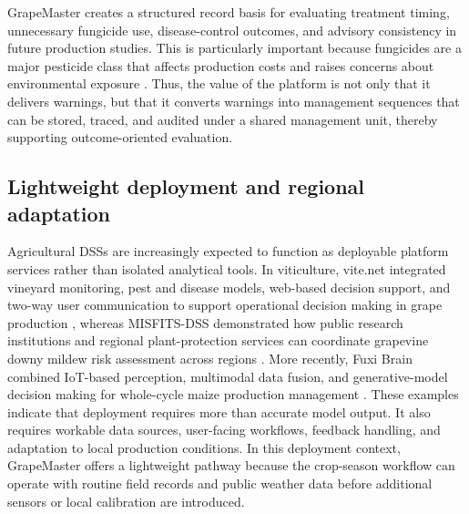 \documentclass[12pt]{article}
\begin{document}
GrapeMaster creates a structured record basis for evaluating treatment timing, unnecessary fungicide use, disease-control outcomes, and advisory consistency in future production studies. This is particularly important because fungicides are a major pesticide class that affects production costs and raises concerns about environmental exposure \citep{zubrodFungicidesOverlookedPesticide2019}. Thus, the value of the platform is not only that it delivers warnings, but that it converts warnings into management sequences that can be stored, traced, and audited under a shared management unit, thereby supporting outcome-oriented evaluation.

\subsection{Lightweight deployment and regional adaptation}\label{lightweight-deployment-and-regional-adaptation}

Agricultural DSSs are increasingly expected to function as deployable platform services rather than isolated analytical tools. In viticulture, vite.net integrated vineyard monitoring, pest and disease models, web-based decision support, and two-way user communication to support operational decision making in grape production \citep{rossiAddressingImplementationProblem2014}, whereas MISFITS-DSS demonstrated how public research institutions and regional plant-protection services can coordinate grapevine downy mildew risk assessment across regions \citep{bregaglioPublicDecisionSupport2022}. More recently, Fuxi Brain combined IoT-based perception, multimodal data fusion, and generative-model decision making for whole-cycle maize production management \citep{chenAgriculturalAutonomousDecisionmaking2026}. These examples indicate that deployment requires more than accurate model output. It also requires workable data sources, user-facing workflows, feedback handling, and adaptation to local production conditions. In this deployment context, GrapeMaster offers a lightweight pathway because the crop-season workflow can operate with routine field records and public weather data before additional sensors or local calibration are introduced.
\end{document}
